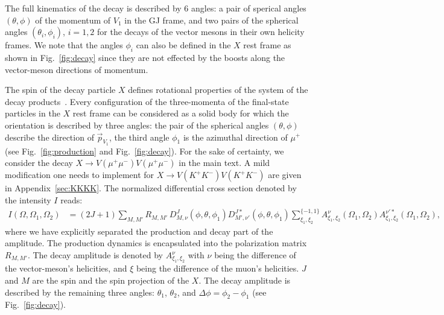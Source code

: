 \documentclass[prd,preprintnumbers,floatfix,
nofootinbib,superscriptaddress]{revtex4}
\newcommand{\diff}{\mathrm{d}}
\begin{document}
The full kinematics of the decay is described by 6 angles: a pair of sperical angles $(\theta,\phi)$ of the momentum of $V_1$ in the GJ frame, and two pairs of the spherical angles $(\theta_i,\phi_i)$, $i=1,2$
for the decays of the vector mesons in their own helicity frames.
We note that the angles $\phi_i$ can also be defined in the $X$ rest frame as shown in Fig.~\ref{fig:decay} since they are not effected by the boosts along the vector-meson directions of momentum.

The spin of the decay particle $X$ defines rotational properties of the system of the decay products~\cite{Mikhasenko:2019rjf}.
Every configuration of the three-momenta of the final-state particles in the $X$ rest frame
can be considered as a solid body for which the orientation is described by three angles:
the pair of the spherical angles $(\theta,\phi)$ describe the direction of $\vec p_{V_1}$,
the third angle $\phi_1$ is the azimuthal direction of $\mu^+$ (see Fig.~\ref{fig:production} and Fig.~\ref{fig:decay}).
For the sake of certainty, we consider the decay $X\to V(\mu^+\mu^-)V(\mu^+\mu^-)$
in the main text. A mild modification one needs to implement for $X\to V(K^+K^-)V(K^+K^-)$ are given in Appendix~\ref{sec:KKKK}.
The normalized differential cross section denoted by the intensity $I$ reads:
%
\begin{align}
    I(\Omega,\Omega_1,\Omega_2) &= (2J+1) \sum_{M,M'}R_{M,M'}\,
    D_{M,\nu}^{J}(\phi,\theta,\phi_1) D_{M',\nu'}^{J*}(\phi,\theta,\phi_1)
    \sum_{\xi_1,\xi_2}^{\{-1,1\}}
    A^{\nu}_{\xi_1,\xi_2}(\Omega_1,\Omega_2) A^{\nu'*}_{\xi_1,\xi_2}(\Omega_1,\Omega_2),
\end{align}
where we have explicitly separated the production and decay part of the amplitude.
The production dynamics is encapsulated into the polarization matrix $R_{M,M'}$.
The decay amplitude is denoted by $A^{\nu}_{\xi_1,\xi_2}$
with $\nu$ being the difference of the vector-meson's helicities, and $\xi$ being the difference of the muon's helicities. $J$ and $M$ are the spin and the spin projection of the $X$.
The decay amplitude is described by the remaining three angles: $\theta_1$, $\theta_2$, and $\Delta\phi = \phi_2-\phi_1$ (see Fig.~\ref{fig:decay}).
\end{document}

